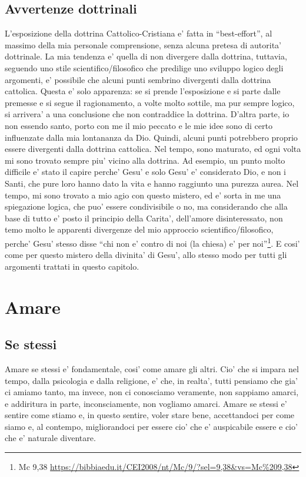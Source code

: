\subsection{Avvertenze dottrinali}
L'esposizione della dottrina Cattolico-Cristiana e' fatta in ``best-effort'', al massimo della mia personale comprensione, senza alcuna pretesa di autorita' dottrinale. La mia tendenza e' quella di non divergere dalla dottrina, tuttavia, seguendo uno stile scientifico/filosofico che predilige uno sviluppo logico degli argomenti, e' possibile che alcuni punti sembrino divergenti dalla dottrina cattolica. Questa e' solo apparenza: se si prende l'esposizione e si parte dalle premesse e si segue il ragionamento, a volte molto sottile, ma pur sempre logico, si arrivera' a una conclusione che non contraddice la dottrina. D'altra parte, io non essendo santo, porto con me il mio peccato e le mie idee sono di certo influenzate dalla mia lontananza da Dio. Quindi, alcuni punti potrebbero proprio essere divergenti dalla dottrina cattolica. Nel tempo, sono maturato, ed ogni volta mi sono trovato sempre piu' vicino alla dottrina. Ad esempio, un punto molto difficile e' stato il capire perche' Gesu' e solo Gesu' e' considerato Dio, e non i Santi, che pure loro hanno dato la vita e hanno raggiunto una purezza aurea. Nel tempo, mi sono trovato a mio agio con questo mistero, ed e' sorta in me una spiegazione logica, che puo' essere condivisibile o no, ma considerando che alla base di tutto e' posto il principio della Carita', dell'amore disinteressato, non temo molto le apparenti divergenze del mio approccio scientifico/filosofico, perche' Gesu' stesso disse ``chi non e' contro di noi (la chiesa) e' per noi''\footnote{Mc 9,38 \url{https://bibbiaedu.it/CEI2008/nt/Mc/9/?sel=9,38\&vs=Mc\%209,38}}. E cosi' come per questo mistero della divinita' di Gesu', allo stesso modo per tutti gli argomenti trattati in questo capitolo.


\section{Amare}
\label{amareSe}


\subsection{Se stessi}
Amare se stessi e' fondamentale, cosi' come amare gli altri. Cio' che si impara nel tempo, dalla psicologia e dalla religione, e' che, in realta', tutti pensiamo che gia' ci amiamo tanto, ma invece, non ci conosciamo veramente, non sappiamo amarci, e addiritura in parte, inconsciamente, non vogliamo amarci. 
Amare se stessi e' sentire come stiamo e, in questo sentire, voler stare bene, accettandoci per come siamo e, al contempo, migliorandoci per essere cio' che e' auspicabile essere e cio' che e' naturale diventare.

